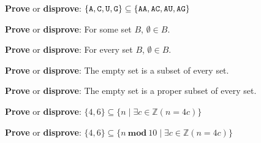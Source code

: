 
{\bf Prove} or {\bf  disprove}: $\{ \texttt{A},  \texttt{C},  \texttt{U},  \texttt{G}\} \subseteq \{ \texttt{A}\texttt{A}, \texttt{A}\texttt{C}, \texttt{A}\texttt{U}, \texttt{A}\texttt{G} \}$ 

\vspace{80pt}

{\bf Prove} or {\bf  disprove}: For some set $B$, $\emptyset \in B$.

\vspace{80pt}

{\bf Prove} or {\bf  disprove}: For every set $B$, $\emptyset \in B$.

\vspace{80pt}

{\bf Prove} or {\bf  disprove}: The empty set is a subset of every set.

\vspace{80pt}

{\bf Prove} or {\bf  disprove}: The empty set is a proper subset of every set.

\vspace{80pt}

{\bf Prove} or {\bf  disprove}: $\{ 4, 6 \} \subseteq \{ n \mid  \exists c \in \mathbb{Z} ( n = 4c) \} $

\vspace{80pt}

{\bf Prove} or {\bf  disprove}: $\{ 4, 6 \} \subseteq \{ n ~\textbf{mod}~10 \mid  \exists c \in \mathbb{Z} ( n = 4c) \} $

\vspace{80pt}

